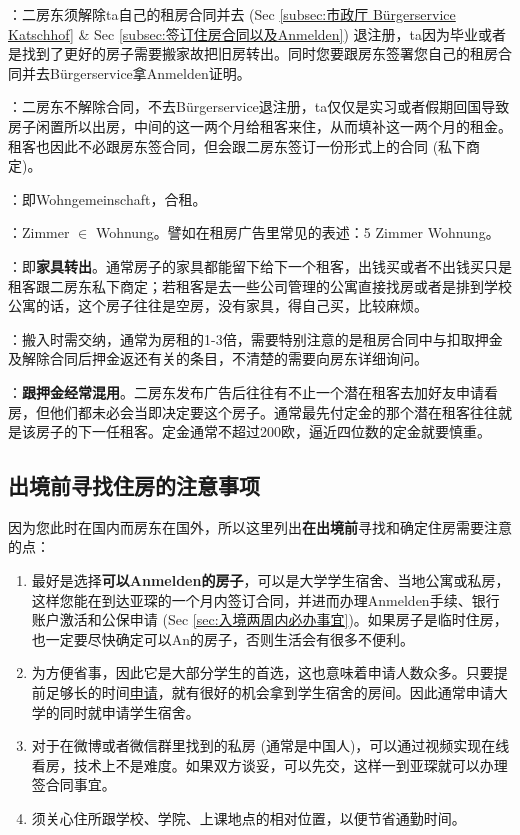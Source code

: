     ：二房东须解除ta自己的租房合同并去 (Sec \ref{subsec:市政厅 Bürgerservice Katschhof} \& Sec \ref{subsec:签订住房合同以及Anmelden}) 退注册，ta因为毕业或者是找到了更好的房子需要搬家故把旧房转出。同时您要跟房东签署您自己的租房合同并去Bürgerservice拿Anmelden证明。

    ：二房东不解除合同，不去Bürgerservice退注册，ta仅仅是实习或者假期回国导致房子闲置所以出房，中间的这一两个月给租客来住，从而填补这一两个月的租金。租客也因此不必跟房东签合同，但会跟二房东签订一份形式上的合同 (私下商定)。

    ：即Wohngemeinschaft，合租。

    ：Zimmer $\in$ Wohnung。譬如在租房广告里常见的表述：5 Zimmer Wohnung。

    ：即\textbf{家具转出}。通常房子的家具都能留下给下一个租客，出钱买或者不出钱买只是租客跟二房东私下商定；若租客是去一些公司管理的公寓直接找房或者是排到学校公寓的话，这个房子往往是空房，没有家具，得自己买，比较麻烦。

    ：搬入时需交纳，通常为房租的1-3倍，需要特别注意的是租房合同中与扣取押金及解除合同后押金返还有关的条目，不清楚的需要向房东详细询问。

    ：\textbf{跟押金经常混用}。二房东发布广告后往往有不止一个潜在租客去加好友申请看房，但他们都未必会当即决定要这个房子。通常最先付定金的那个潜在租客往往就是该房子的下一任租客。定金通常不超过200欧，逼近四位数的定金就要慎重。

  \subsection{出境前寻找住房的注意事项}\label{subsec:出境前寻找住房的注意事项}

    因为您此时在国内而房东在国外，所以这里列出\textbf{在出境前}寻找和确定住房需要注意的点：

    \begin{enumerate}
      \item 最好是选择\textbf{可以Anmelden的房子}，可以是大学学生宿舍、当地公寓或私房，这样您能在到达亚琛的一个月内签订合同，并进而办理Anmelden手续、银行账户激活和公保申请 (Sec \ref{sec:入境两周内必办事宜})。如果房子是临时住房，也一定要尽快确定可以An的房子，否则生活会有很多不便利。
      \item {}为方便省事，因此它是大部分学生的首选，这也意味着申请人数众多。只要提前足够长的时间\href{https://bewerberportal.stw.rwth-aachen.de/}{申请}，就有很好的机会拿到学生宿舍的房间。因此通常申请大学的同时就申请学生宿舍。
      \item 对于在微博或者微信群里找到的私房 (通常是中国人)，可以通过视频实现在线看房，技术上不是难度。如果双方谈妥，可以先交，这样一到亚琛就可以办理签合同事宜。
      \item 须关心住所跟学校、学院、上课地点的相对位置，以便节省通勤时间。
    \end{enumerate}

